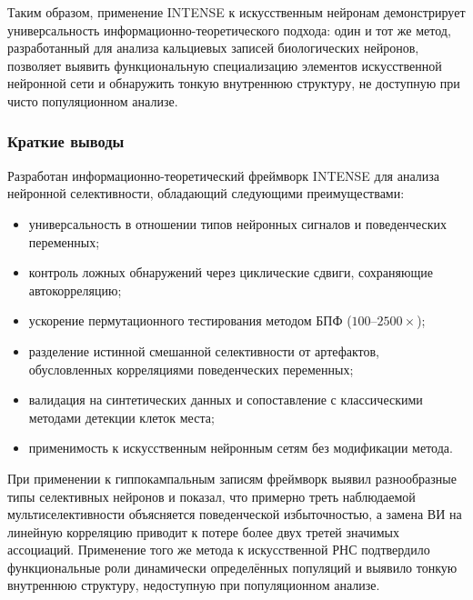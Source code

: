 Таким образом, применение INTENSE к искусственным нейронам демонстрирует универсальность информационно-теоретического подхода: один и тот же метод, разработанный для анализа кальциевых записей биологических нейронов, позволяет выявить функциональную специализацию элементов искусственной нейронной сети и обнаружить тонкую внутреннюю структуру, не доступную при чисто популяционном анализе.

\subsubsection{Краткие выводы}

Разработан информационно-теоретический фреймворк INTENSE для анализа нейронной селективности, обладающий следующими преимуществами:
\begin{itemize}
    \item универсальность в отношении типов нейронных сигналов и поведенческих переменных;
    \item контроль ложных обнаружений через циклические сдвиги, сохраняющие автокорреляцию;
    \item ускорение пермутационного тестирования методом БПФ ($100$--$2500\times$);
    \item разделение истинной смешанной селективности от артефактов, обусловленных корреляциями поведенческих переменных;
    \item валидация на синтетических данных и сопоставление с классическими методами детекции клеток места;
    \item применимость к искусственным нейронным сетям без модификации метода.
\end{itemize}

При применении к гиппокампальным записям фреймворк выявил разнообразные типы селективных нейронов и показал, что примерно треть наблюдаемой мультиселективности объясняется поведенческой избыточностью, а замена ВИ на линейную корреляцию приводит к потере более двух третей значимых ассоциаций. Применение того же метода к искусственной РНС подтвердило функциональные роли динамически определённых популяций и выявило тонкую внутреннюю структуру, недоступную при популяционном анализе.

